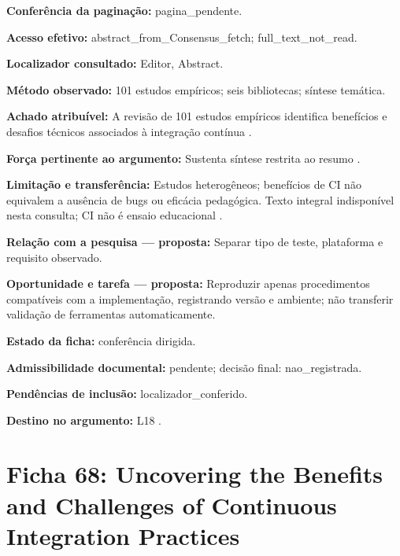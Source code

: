 \noindent\textbf{Conferência da paginação:} pagina\_pendente.\par\medskip

\noindent\textbf{Acesso efetivo:} abstract\_from\_Consensus\_fetch; full\_text\_not\_read.\par\medskip

\noindent\textbf{Localizador consultado:} Editor, Abstract.\par\medskip

\noindent\textbf{Método observado:} 101 estudos empíricos; seis bibliotecas; síntese temática.\par\medskip

\noindent\textbf{Achado atribuível:} A revisão de 101 estudos empíricos identifica benefícios e desafios técnicos associados à integração contínua \citep{eng15}.\par\medskip

\noindent\textbf{Força pertinente ao argumento:} Sustenta síntese restrita ao resumo \citep{eng15}.\par\medskip

\noindent\textbf{Limitação e transferência:} Estudos heterogêneos; benefícios de CI não equivalem a ausência de bugs ou eficácia pedagógica. Texto integral indisponível nesta consulta; CI não é ensaio educacional \citep{eng15}.\par\medskip

\noindent\textbf{Relação com a pesquisa — proposta:} Separar tipo de teste, plataforma e requisito observado.\par\medskip

\noindent\textbf{Oportunidade e tarefa — proposta:} Reproduzir apenas procedimentos compatíveis com a implementação, registrando versão e ambiente; não transferir validação de ferramentas automaticamente.\par\medskip

\noindent\textbf{Estado da ficha:} conferência dirigida.\par\medskip

\noindent\textbf{Admissibilidade documental:} pendente; decisão final: nao\_registrada.\par\medskip

\noindent\textbf{Pendências de inclusão:} localizador\_conferido.\par\medskip

\noindent\textbf{Destino no argumento:} L18 .

\clearpage\section*{Ficha 68: Uncovering the Benefits and Challenges of Continuous Integration Practices}

